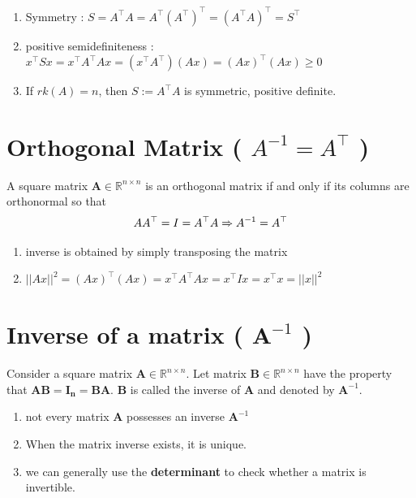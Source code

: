 \begin{enumerate}
    \item Symmetry : $S = A^\top A = A^\top (A^\top )^\top  = (A^\top A)^\top  = S^\top$ 

    \item positive semidefiniteness : $x^\top Sx = x^\top A^\top Ax = (x^\top A^\top )(Ax) = (Ax)^\top (Ax) \geq 0$ 

    \item If $rk(A) = n$, then $S := A^\top A$ is symmetric, positive definite.
\end{enumerate}



\section{Orthogonal Matrix ( $A^{-1} = A^\top$ ) \cite{mfml-1}}\label{Orthogonal Matrix}
A square matrix $\mathbf{A} \in \mathbb{R}^{n\times n}$ is an orthogonal matrix if and only if its columns are orthonormal so that 
\[
    \hfill
    AA^\top  = I = A^\top A  
    \Rightarrow  A^{-1} = A^\top 
    \hfill
\]

\begin{enumerate}
    \item inverse is obtained by simply transposing the matrix

    \item $||Ax||^2 = (Ax)^\top (Ax) = x^\top A^\top Ax = x^\top Ix = x^\top x = ||x||^2$
\end{enumerate}


\section{Inverse of a matrix ( $\mathbf{A}^{-1}$ ) \cite{mfml-1}}\label{Inverse of a matrix}

Consider a square matrix $\mathbf{A} \in \mathbb{R}^{n\times n}$. Let matrix $\mathbf{B} \in \mathbb{R}^{n\times n}$ have the property that $\mathbf{AB = I_n = BA}$. $\mathbf{B}$ is called the inverse of $\mathbf{A}$ and denoted by $\mathbf{A}^{-1}$.

\begin{enumerate}
    \item not every matrix $\mathbf{A}$ possesses an inverse $\mathbf{A}^{-1}$

    \item When the matrix inverse exists, it is unique.
    
    \item we can generally use the \textbf{determinant} to check whether a matrix is invertible.
\end{enumerate}

